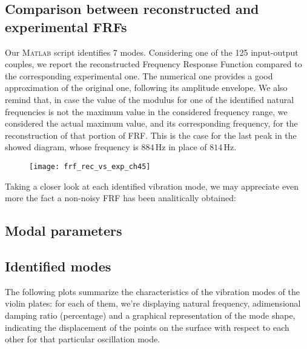 \documentclass[a4paper,12pt,oneside]{article}
\begin{document}
\subsection{Comparison between reconstructed and experimental FRFs}

Our \textsc{Matlab} script identifies 7 modes. Considering one of the 125 input-output couples, we report the reconstructed Frequency Response Function compared to the corresponding experimental one. The numerical one provides a good approximation of the original one, following its amplitude envelope. We also remind that, in case the value of the modulus for one of the identified natural frequencies is not the maximum value in the considered frequency range, we considered the actual maximum value, and its corresponding frequency, for the reconstruction of that portion of FRF. This is the case for the last peak in the showed diagram, whose frequency is $ 884 \, \text{Hz} $ in place of $ 814 \, \text{Hz} $.

\begin{figure}[H]
	\hspace{-70pt}
	\texttt{[image: frf\_rec\_vs\_exp\_ch45]}
\end{figure}

Taking a closer look at each identified vibration mode, we may appreciate even more the fact a non-noisy FRF has been analitically obtained:

\subsection{Modal parameters}

\subsection{Identified modes}

The following plots summarize the characteristics of the vibration modes of the violin plates: for each of them, we're displaying natural frequency, adimensional damping ratio (percentage) and a graphical representation of the mode shape, indicating the displacement of the points on the surface with respect to each other for that particular oscillation mode.

\begin{figure}[H]
	 \quad
	 \\
	 \quad
	 \\
	 \quad
	 \\
	\begin{center}
	\end{center}
\end{figure}
\end{document}
